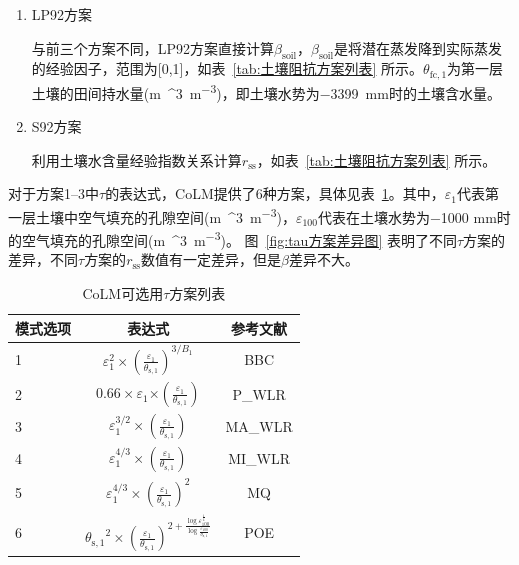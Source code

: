 \begin{enumerate}
  \item
    LP92方案

    与前三个方案不同，LP92方案直接计算\(\beta_{\mathrm{soil}}\)，\(\beta_{\mathrm{soil}}\)是将潜在蒸发降到实际蒸发的经验因子，范围为{[}0,1{]}，如表~\ref{tab:土壤阻抗方案列表} 所示。\(\theta_{\mathrm{fc,1}}\)为第一层土壤的田间持水量(\unit{m{^3}.m^{-3}})，即土壤水势为\qty{-3399}{mm}时的土壤含水量。

  \item
    S92方案

    利用土壤水含量经验指数关系计算\(r_{\mathrm{ss}}\)，如表~\ref{tab:土壤阻抗方案列表} 所示。
%
\end{enumerate}

对于方案1--3中\(\tau\)的表达式，CoLM提供了6种方案，具体见表~\ref{tab:tau方案列表}。其中，\(\varepsilon_{1}\)代表第一层土壤中空气填充的孔隙空间(\unit{m{^3}.m^{-3}})，\(\varepsilon_{100}\)代表在土壤水势为\num{-1000} mm时的空气填充的孔隙空间(\unit{m{^3}.m^{-3}})。
图~\ref{fig:tau方案差异图} 表明了不同\(\tau\)方案的差异，不同\(\tau\)方案的\(r_{\mathrm{ss}}\)数值有一定差异，但是$\beta$差异不大。

{
  \begin{table}[htbp]
    \centering
    \caption{CoLM可选用$\tau$方案列表}
    \label{tab:tau方案列表}
    \begin{tabular}{lcc}
      \toprule
      模式选项 & 表达式 & 参考文献 \\
      \midrule
      1 &
      \(\varepsilon_{1}^{2} \times {(\frac{\varepsilon_{1}}{\theta_{\mathrm{s,1}}})}^{3/B_{1}}\)
      & \citet{BBC1999} BBC \\
      2 & \(0.66 \times \varepsilon_{1}{\times (\frac{\varepsilon_{1}}{\theta_{\mathrm{s,1}}})}\)
      & \citet{moldrup2000} P\_WLR \\
      3 & \(\varepsilon_{1}^{3/2} \times (\frac{\varepsilon_{1}}{\theta_{\mathrm{s,1}}})\)
      & \citet{moldrup2000} MA\_WLR \\
      4 & \(\varepsilon_{1}^{4/3} \times (\frac{\varepsilon_{1}}{\theta_{\mathrm{s,1}}})\)
      & \citet{moldrup2000} MI\_WLR \\
      5 & \(\varepsilon_{1}^{4/3} \times {(\frac{\varepsilon_{1}}{\theta_{\mathrm{s,1}}})}^{2}\)
      & \citet{millington_permeability_1961} MQ \\
      6 & \({\theta_{\mathrm{s,1}}}^{2} \times {(\frac{\varepsilon_{1}}{\theta_{\mathrm{s,1}}})}^{2 + \frac{\log\varepsilon_{100}^{\frac{1}{4}}}{\log\frac{\varepsilon_{100}}{\theta_{\mathrm{s,1}}}}}\) & \citet{POE2005} POE \\ \bottomrule
    \end{tabular}
  \end{table}
}

